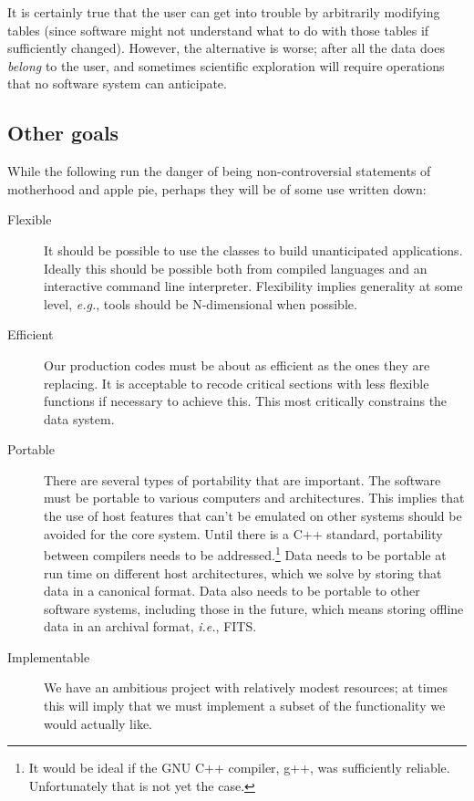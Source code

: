 It is certainly true that the user can get into trouble by arbitrarily
modifying tables (since software might not understand what to do with
those tables if sufficiently changed). However, the alternative is
worse; after all the data does {\em belong} to the user, and sometimes
scientific exploration will require operations that no software system
can anticipate.

\subsection{Other goals}

While the following run the danger of being non-controversial
statements of motherhood and apple pie, perhaps they will be of some
use written down:

\begin{description}
\item[Flexible]
    It should be possible to use the classes to build unanticipated
    applications. Ideally this should be possible both from compiled
    languages and an interactive command line interpreter. Flexibility
    implies generality at some level, {\it e.g.}, tools should be
    N-dimensional when possible.

\item[Efficient]
    Our production codes must be about as efficient as the ones they are
    replacing. It is acceptable to recode critical sections with less flexible
    functions if necessary to achieve this. This most critically
    constrains the data system.

\item[Portable]
    There are several types of portability that are important. The
    software must be portable to various computers and architectures.
    This implies that the use of host features that can't be emulated on
    other systems should be avoided for the core system. Until there is
    a C++ standard, portability between compilers needs to be
    addressed.\footnote{It would be ideal if the GNU C++ compiler,
     g++, was sufficiently reliable. Unfortunately that is not yet the case.}
     Data needs to be portable at run time on different host
    architectures, which we solve by storing that data in a canonical
    format.
    Data also needs to be portable to other software systems,
    including those in the future, which means storing offline data in
    an archival format, {\em i.e.}, FITS.

\item[Implementable]
    We have an ambitious project with relatively modest resources; at
    times this will imply that we must implement a subset of the
    functionality we would actually like.
\end{description}

